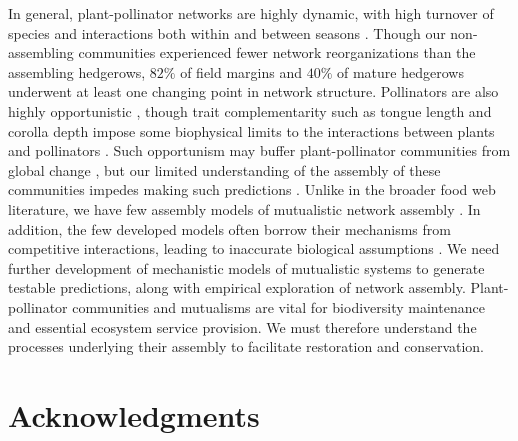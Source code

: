 \documentclass[12pt]{article}
\begin{document}

In general, plant-pollinator networks are highly dynamic, with high
turnover of species and interactions both within and between seasons
\citep{Burkle2011}. Though our non-assembling communities experienced
fewer network reorganizations than the assembling hedgerows, $82\%$ of
field margins and $40\%$ of mature hedgerows underwent at least one
changing point in network structure. Pollinators are also highly
opportunistic \citep{petanidou-2008-564, Vazquez2005b,
  albrecht2010plant}, though trait complementarity such as tongue
length and corolla depth impose some biophysical limits to the
interactions between plants and pollinators
\citep{Vazquez2009evaluating, Vazquez2009, Stang2009, Stang2006,
  Santamaria2007}. Such opportunism may buffer plant-pollinator
communities from global change \citep[e.g.,][]{ramos2012topological,
  kaiser2010robustness}, but our limited understanding of the assembly
of these communities impedes making such predictions
\citep{Vazquez2009, Burkle2011}. Unlike in the broader food web
literature, we have few assembly models of mutualistic network
assembly \citep{valdovinos2013adaptive, Nuismer2013, Guimaraes2011}.
In addition, the few developed models often borrow their mechanisms
from competitive interactions, leading to inaccurate biological
assumptions \citep{holland2006comment}. We need further development of
mechanistic models of mutualistic systems to generate testable
predictions, along with empirical exploration of network
assembly. Plant-pollinator communities and mutualisms are vital for
biodiversity maintenance and essential ecosystem service provision. We
must therefore understand the processes underlying their assembly to
facilitate restoration and conservation.

\section*{Acknowledgments}
\label{sec:acknowledge}
\end{document}
